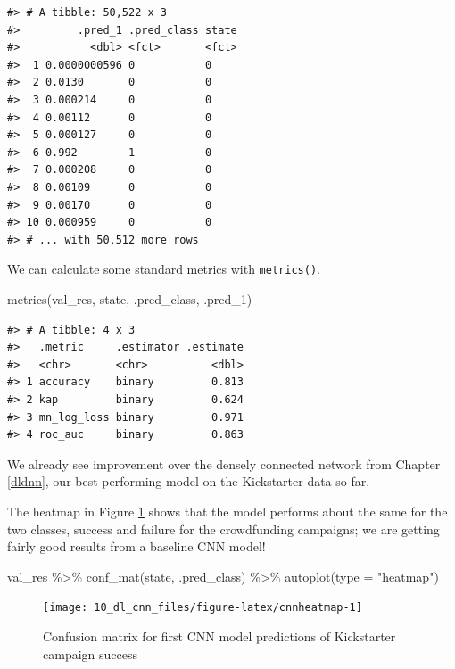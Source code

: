 \documentclass[
]{krantz}
\makeatletter
\newenvironment{Shaded}{\begin{snugshade}}{\end{snugshade}}
\newcommand{\AttributeTok}[1]{\textcolor[rgb]{0.77,0.63,0.00}{#1}}
\newcommand{\FunctionTok}[1]{\textcolor[rgb]{0.00,0.00,0.00}{#1}}
\newcommand{\NormalTok}[1]{#1}
\newcommand{\SpecialCharTok}[1]{\textcolor[rgb]{0.00,0.00,0.00}{#1}}
\newcommand{\StringTok}[1]{\textcolor[rgb]{0.31,0.60,0.02}{#1}}
\newenvironment{kframe}{%
\medskip{}
\setlength{\fboxsep}{.8em}
 \def\at@end@of@kframe{}%
 \ifinner\ifhmode%
  \def\at@end@of@kframe{\end{minipage}}%
  \begin{minipage}{\columnwidth}%
 \fi\fi%
 \def\FrameCommand##1{\hskip\@totalleftmargin \hskip-\fboxsep
 \colorbox{shadecolor}{##1}\hskip-\fboxsep
     \hskip-\linewidth \hskip-\@totalleftmargin \hskip\columnwidth}%
 \MakeFramed {\advance\hsize-\width
   \@totalleftmargin\z@ \linewidth\hsize
   \@setminipage}}%
 {\par\unskip\endMakeFramed%
 \at@end@of@kframe}
\renewenvironment{Shaded}{\begin{kframe}}{\end{kframe}}
\makeatother
\begin{document}
\begin{verbatim}
#> # A tibble: 50,522 x 3
#>         .pred_1 .pred_class state
#>           <dbl> <fct>       <fct>
#>  1 0.0000000596 0           0    
#>  2 0.0130       0           0    
#>  3 0.000214     0           0    
#>  4 0.00112      0           0    
#>  5 0.000127     0           0    
#>  6 0.992        1           0    
#>  7 0.000208     0           0    
#>  8 0.00109      0           0    
#>  9 0.00170      0           0    
#> 10 0.000959     0           0    
#> # ... with 50,512 more rows
\end{verbatim}

We can calculate some standard metrics with \texttt{metrics()}.

\begin{Shaded}
\begin{Highlighting}[]
\FunctionTok{metrics}\NormalTok{(val\_res, state, .pred\_class, .pred\_1)}
\end{Highlighting}
\end{Shaded}

\begin{verbatim}
#> # A tibble: 4 x 3
#>   .metric     .estimator .estimate
#>   <chr>       <chr>          <dbl>
#> 1 accuracy    binary         0.813
#> 2 kap         binary         0.624
#> 3 mn_log_loss binary         0.971
#> 4 roc_auc     binary         0.863
\end{verbatim}

We already see improvement over the densely connected network from Chapter \ref{dldnn}, our best performing model on the Kickstarter data so far.

The heatmap in Figure \ref{fig:cnnheatmap} shows that the model performs about the same for the two classes, success and failure for the crowdfunding campaigns; we are getting fairly good results from a baseline CNN model!

\begin{Shaded}
\begin{Highlighting}[]
\NormalTok{val\_res }\SpecialCharTok{\%\textgreater{}\%}
  \FunctionTok{conf\_mat}\NormalTok{(state, .pred\_class) }\SpecialCharTok{\%\textgreater{}\%}
  \FunctionTok{autoplot}\NormalTok{(}\AttributeTok{type =} \StringTok{"heatmap"}\NormalTok{)}
\end{Highlighting}
\end{Shaded}

\begin{figure}

{\centering \texttt{[image: 10\_dl\_cnn\_files/figure-latex/cnnheatmap-1]} 

}

\caption{Confusion matrix for first CNN model predictions of Kickstarter campaign success}\label{fig:cnnheatmap}
\end{figure}
\end{document}
